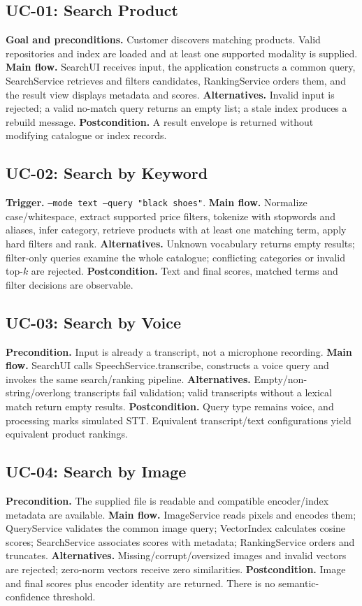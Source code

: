 \documentclass[11pt,a4paper]{article}
\begin{document}
\subsection{UC-01: Search Product}
\textbf{Goal and preconditions.} Customer discovers matching products. Valid repositories and index are loaded and at least one supported modality is supplied. \textbf{Main flow.} SearchUI receives input, the application constructs a common query, SearchService retrieves and filters candidates, RankingService orders them, and the result view displays metadata and scores. \textbf{Alternatives.} Invalid input is rejected; a valid no-match query returns an empty list; a stale index produces a rebuild message. \textbf{Postcondition.} A result envelope is returned without modifying catalogue or index records.

\subsection{UC-02: Search by Keyword}
\textbf{Trigger.} \texttt{--mode text --query "black shoes"}. \textbf{Main flow.} Normalize case/whitespace, extract supported price filters, tokenize with stopwords and aliases, infer category, retrieve products with at least one matching term, apply hard filters and rank. \textbf{Alternatives.} Unknown vocabulary returns empty results; filter-only queries examine the whole catalogue; conflicting categories or invalid top-$k$ are rejected. \textbf{Postcondition.} Text and final scores, matched terms and filter decisions are observable.

\subsection{UC-03: Search by Voice}
\textbf{Precondition.} Input is already a transcript, not a microphone recording. \textbf{Main flow.} SearchUI calls SpeechService.transcribe, constructs a voice query and invokes the same search/ranking pipeline. \textbf{Alternatives.} Empty/non-string/overlong transcripts fail validation; valid transcripts without a lexical match return empty results. \textbf{Postcondition.} Query type remains voice, and processing marks simulated STT. Equivalent transcript/text configurations yield equivalent product rankings.

\subsection{UC-04: Search by Image}
\textbf{Precondition.} The supplied file is readable and compatible encoder/index metadata are available. \textbf{Main flow.} ImageService reads pixels and encodes them; QueryService validates the common image query; VectorIndex calculates cosine scores; SearchService associates scores with metadata; RankingService orders and truncates. \textbf{Alternatives.} Missing/corrupt/oversized images and invalid vectors are rejected; zero-norm vectors receive zero similarities. \textbf{Postcondition.} Image and final scores plus encoder identity are returned. There is no semantic-confidence threshold.
\end{document}
